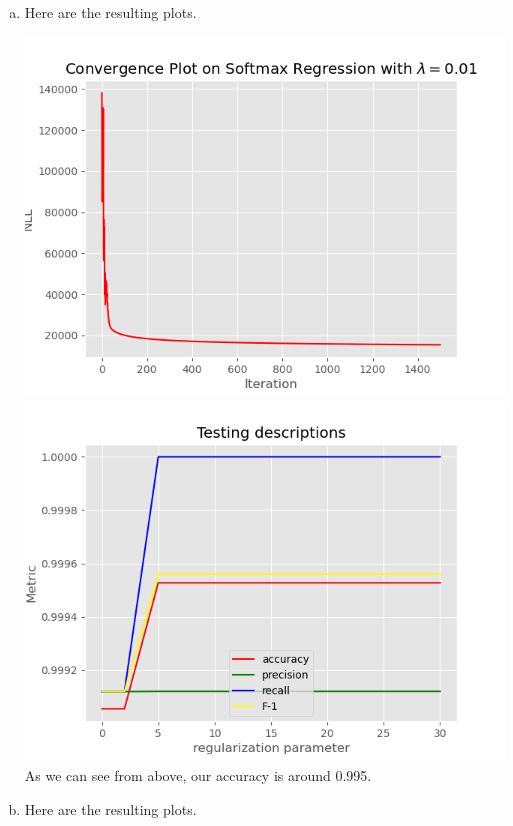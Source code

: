 \documentclass[12pt,letterpaper,fleqn]{hmcpset}
\begin{document}
\newpage
\begin{solution}
\begin{enumerate}[(a)]
	\item Here are the resulting plots.
	
	\includegraphics[scale=0.5]{hw4pr2b_convergence.png}
	\includegraphics[scale=0.5]{hw4pr2a_description.png}
	As we can see from above, our accuracy is around 0.995.
	
	\item Here are the resulting plots.
	

\end{enumerate}
\end{solution}
\end{document}
